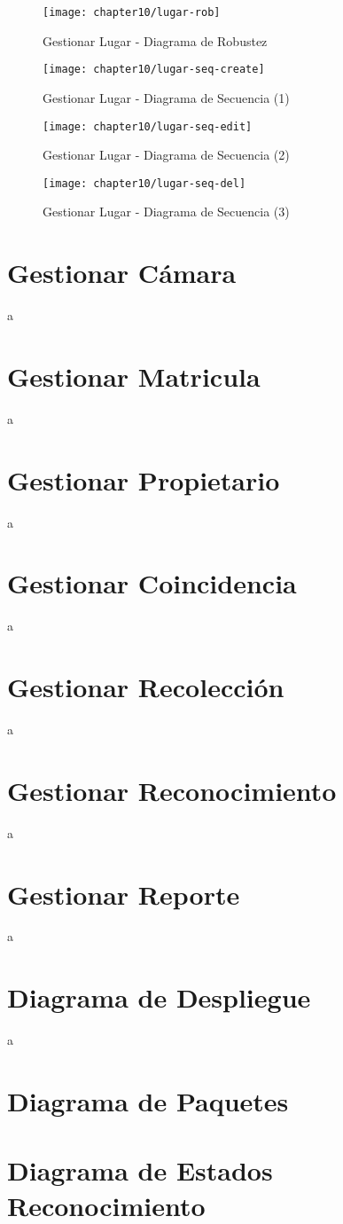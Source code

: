     \begin{figure}[H]
        \centering
        \texttt{[image: chapter10/lugar-rob]}
        \caption{Gestionar Lugar - Diagrama de Robustez}
        \label{fig:lugar-rob}
    \end{figure}
    
    \begin{figure}[H]
        \centering
        \texttt{[image: chapter10/lugar-seq-create]}
        \caption{Gestionar Lugar - Diagrama de Secuencia (1) }
        \label{fig:lugar-seq-create}
    \end{figure}
    
    \begin{figure}[H]
        \centering
        \texttt{[image: chapter10/lugar-seq-edit]}
        \caption{Gestionar Lugar - Diagrama de Secuencia (2) }
        \label{fig:lugar-seq-edit}
    \end{figure}
    
    \begin{figure}[H]
        \centering
        \texttt{[image: chapter10/lugar-seq-del]}
        \caption{Gestionar Lugar - Diagrama de Secuencia (3) }
        \label{fig:lugar-seq-del}
    \end{figure}

\section{Gestionar Cámara}
a
\section{Gestionar Matricula}
a
\section{Gestionar Propietario}
a
\section{Gestionar Coincidencia}
a
\section{Gestionar Recolección}
a
\section{Gestionar Reconocimiento}
a
\section{Gestionar Reporte}
a

\section{Diagrama de Despliegue}
a
\section{Diagrama de Paquetes}
\section{Diagrama de Estados Reconocimiento}

